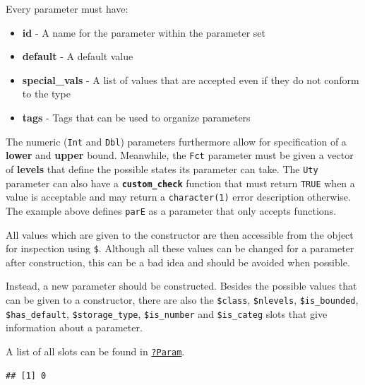 \documentclass[
]{scrbook}
\newenvironment{Shaded}{\begin{snugshade}}{\end{snugshade}}
\newcommand{\NormalTok}[1]{#1}
\newcommand{\SpecialCharTok}[1]{\textcolor[rgb]{0.00,0.00,0.00}{#1}}
\providecommand{\tightlist}{%
  \setlength{\itemsep}{0pt}\setlength{\parskip}{0pt}}
\renewenvironment{Shaded} {\begin{snugshade}\small} {\end{snugshade}}
\begin{document}
Every parameter must have:

\begin{itemize}
\tightlist
\item
  \textbf{id} - A name for the parameter within the parameter set
\item
  \textbf{default} - A default value
\item
  \textbf{special\_vals} - A list of values that are accepted even if they do not conform to the type
\item
  \textbf{tags} - Tags that can be used to organize parameters
\end{itemize}

The numeric (\texttt{Int} and \texttt{Dbl}) parameters furthermore allow for specification of a \textbf{lower} and \textbf{upper} bound.
Meanwhile, the \texttt{Fct} parameter must be given a vector of \textbf{levels} that define the possible states its parameter can take.
The \texttt{Uty} parameter can also have a \textbf{\texttt{custom\_check}} function that must return \texttt{TRUE} when a value is acceptable and may return a \texttt{character(1)} error description otherwise.
The example above defines \texttt{parE} as a parameter that only accepts functions.

All values which are given to the constructor are then accessible from the object for inspection using \texttt{\$}.
Although all these values can be changed for a parameter after construction, this can be a bad idea and should be avoided when possible.

Instead, a new parameter should be constructed.
Besides the possible values that can be given to a constructor, there are also the \texttt{\$class}, \texttt{\$nlevels}, \texttt{\$is\_bounded}, \texttt{\$has\_default}, \texttt{\$storage\_type}, \texttt{\$is\_number} and \texttt{\$is\_categ} slots that give information about a parameter.

A list of all slots can be found in \href{https://paradox.mlr-org.com/reference/Param.html}{\texttt{?Param}}.

\begin{Shaded}
\end{Shaded}

\begin{verbatim}
## [1] 0
\end{verbatim}

\begin{Shaded}
\end{Shaded}
\end{document}
